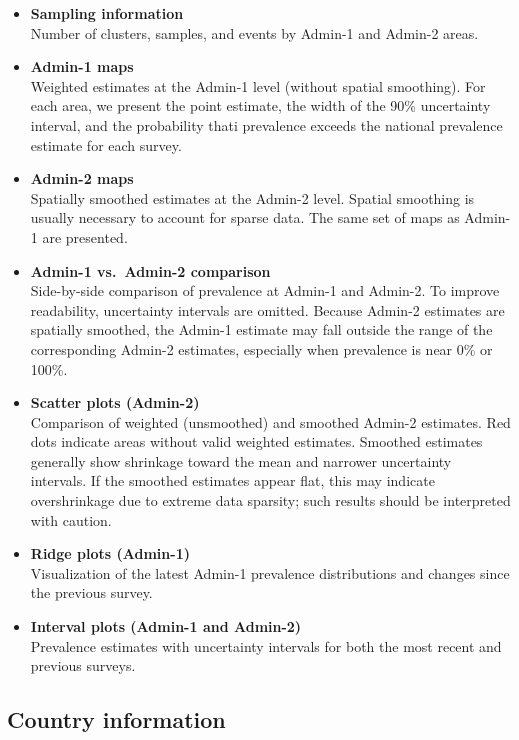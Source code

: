 \documentclass[
]{article}
\begin{document}
\begin{itemize}
\item
  \textbf{Sampling information}\\
  Number of clusters, samples, and events by Admin-1 and Admin-2 areas.
\item
  \textbf{Admin-1 maps}\\
  Weighted estimates at the Admin-1 level (without spatial smoothing). For each area, we present the point estimate, the width of the 90\% uncertainty interval, and the probability thati prevalence exceeds the national prevalence estimate for each survey.
\item
  \textbf{Admin-2 maps}\\
  Spatially smoothed estimates at the Admin-2 level. Spatial smoothing is usually necessary to account for sparse data. The same set of maps as Admin-1 are presented.
\item
  \textbf{Admin-1 vs.~Admin-2 comparison}\\
  Side-by-side comparison of prevalence at Admin-1 and Admin-2. To improve readability, uncertainty intervals are omitted. Because Admin-2 estimates are spatially smoothed, the Admin-1 estimate may fall outside the range of the corresponding Admin-2 estimates, especially when prevalence is near 0\% or 100\%.
\item
  \textbf{Scatter plots (Admin-2)}\\
  Comparison of weighted (unsmoothed) and smoothed Admin-2 estimates. Red dots indicate areas without valid weighted estimates. Smoothed estimates generally show shrinkage toward the mean and narrower uncertainty intervals. If the smoothed estimates appear flat, this may indicate overshrinkage due to extreme data sparsity; such results should be interpreted with caution.
\item
  \textbf{Ridge plots (Admin-1)}\\
  Visualization of the latest Admin-1 prevalence distributions and changes since the previous survey.
\item
  \textbf{Interval plots (Admin-1 and Admin-2)}\\
  Prevalence estimates with uncertainty intervals for both the most recent and previous surveys.
\end{itemize}

\newpage

\subsection{Country information}\label{country-information}
\end{document}
